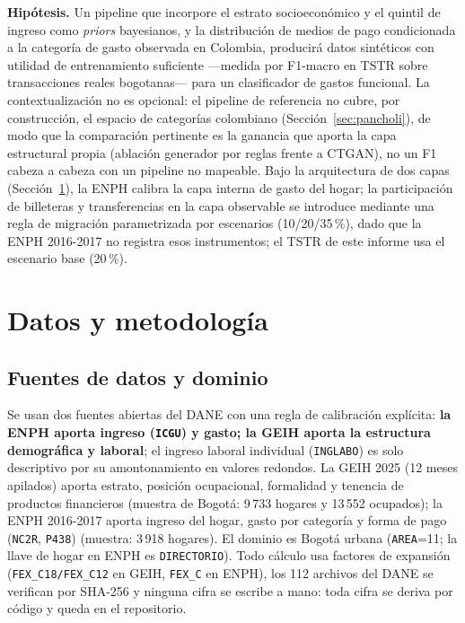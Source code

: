 \documentclass[journal]{IEEEtai}
\begin{document}
\textbf{Hipótesis.} Un pipeline que incorpore el estrato socioeconómico y el quintil de ingreso como \textit{priors} bayesianos, y la distribución de medios de pago condicionada a la categoría de gasto observada en Colombia, producirá datos sintéticos con utilidad de entrenamiento suficiente —medida por F1-macro en TSTR sobre transacciones reales bogotanas— para un clasificador de gastos funcional. La contextualización no es opcional: el pipeline de referencia no cubre, por construcción, el espacio de categorías colombiano (Sección~\ref{sec:pancholi}), de modo que la comparación pertinente es la ganancia que aporta la capa estructural propia (ablación generador por reglas frente a CTGAN), no un F1 cabeza a cabeza con un pipeline no mapeable. Bajo la arquitectura de dos capas (Sección~\ref{sec:metodo}), la ENPH calibra la capa interna de gasto del hogar; la participación de billeteras y transferencias en la capa observable se introduce mediante una regla de migración parametrizada por escenarios (10/20/35\,\%), dado que la ENPH 2016-2017 no registra esos instrumentos; el TSTR de este informe usa el escenario base (20\,\%).

\section{Datos y metodología}
\label{sec:metodo}
\subsection{Fuentes de datos y dominio}
Se usan dos fuentes abiertas del DANE con una regla de calibración explícita: \textbf{la ENPH aporta ingreso (\texttt{ICGU}) y gasto; la GEIH aporta la estructura demográfica y laboral}; el ingreso laboral individual (\texttt{INGLABO}) es solo descriptivo por su amontonamiento en valores redondos. La GEIH 2025 (12 meses apilados) aporta estrato, posición ocupacional, formalidad y tenencia de productos financieros (muestra de Bogotá: 9\,733 hogares y 13\,552 ocupados); la ENPH 2016-2017 aporta ingreso del hogar, gasto por categoría y forma de pago (\texttt{NC2R}, \texttt{P438}) (muestra: 3\,918 hogares). El dominio es Bogotá urbana (\texttt{AREA}=11; la llave de hogar en ENPH es \texttt{DIRECTORIO}). Todo cálculo usa factores de expansión (\texttt{FEX\_C18/FEX\_C12} en GEIH, \texttt{FEX\_C} en ENPH), los 112 archivos del DANE se verifican por SHA-256 y ninguna cifra se escribe a mano: toda cifra se deriva por código y queda en el repositorio.
\end{document}

